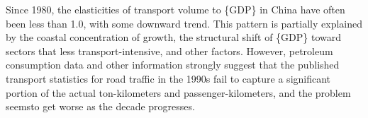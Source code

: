 Since 1980, the elasticities of transport volume to \{GDP\} in China have often been less than 1.0, with some downward trend. This pattern is partially explained by the coastal concentration of growth, the structural shift of \{GDP\} toward sectors that less transport-intensive, and other factors. However, petroleum consumption data and other information strongly suggest that the published transport statistics for road traffic in the 1990s fail to capture a significant portion of the actual ton-kilometers and passenger-kilometers, and the problem seemsto get worse as the decade progresses.
